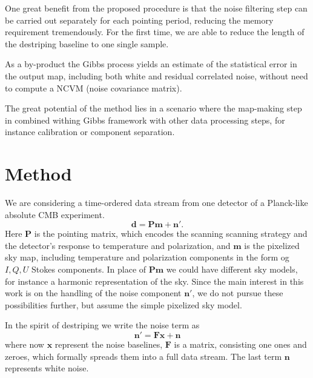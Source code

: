 \documentclass[traditabstract]{aa}
\newcommand{\ve}[1]{{\mathbf #1}}
\newcommand{\ma}[1]{\mathbf{#1}}
\begin{document}
One great benefit from the proposed procedure is that the noise filtering step 
can be carried out separately for each pointing period, reducing the memory 
requirement tremendously.
For the first time, we are able to reduce the length of the destriping baseline 
to one single sample.


As a by-product the Gibbs process yields an estimate of the statistical error 
in the output map, including both white and residual correlated noise,
without need to compute a NCVM (noise covariance matrix).

The great potential of the method
lies in a scenario where the map-making step in combined withing Gibbs framework
with other data processing steps, for instance calibration or component separation.


\section{Method}

We are considering a time-ordered data stream from one detector
of a Planck-like absolute CMB experiment.
%
\begin{equation}
  \ve{d} = \ma{P}\ve{m}  +\ve{n'}.
\end{equation}
%
Here $\ma{P}$ is the pointing matrix, which encodes the scanning scanning strategy
and the detector's response to temperature and polarization, and $\ve{m}$ is
the pixelized sky map, including temperature and polarization components 
in the form og $I,Q,U$ Stokes components.
In place of $\ma{P}\ve{m}$ we could have different sky models, for instance 
a harmonic representation of the sky.  
Since the main interest in this work is on the handling of the noise component $\ve{n'}$,
we do not pursue these possibilities further, but assume the simple pixelized sky model.

In the spirit of destriping we write the noise term as
%
\begin{equation}
  \ve{n'} = \ma{F}\ve{x}  +\ve{n}
\end{equation}
%
where now $\ve{x}$ represent the noise baselines, $\ma{F}$ is a matrix,
consisting one ones and zeroes, which formally spreads
them into a full data stream. The last term $\ve{n}$ represents white noise.
\end{document}
